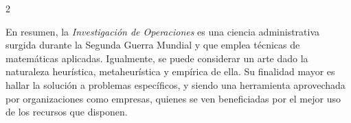 \documentclass[12pt]{article}
\begin{document}
\begin{multicols}{2}

En resumen, la \textit{Investigación de Operaciones} es una ciencia administrativa surgida durante la Segunda Guerra Mundial y que emplea técnicas de matemáticas aplicadas. Igualmente, se puede considerar un arte dado la naturaleza heurística, metaheurística y empírica de ella. Su finalidad mayor es hallar la solución a problemas específicos, y siendo una herramienta aprovechada por organizaciones como empresas, quienes se ven beneficiadas por el mejor uso de los recursos que disponen.


\nocite{*}
\printbibliography[heading=bibintoc]

\end{multicols}
\end{document}
